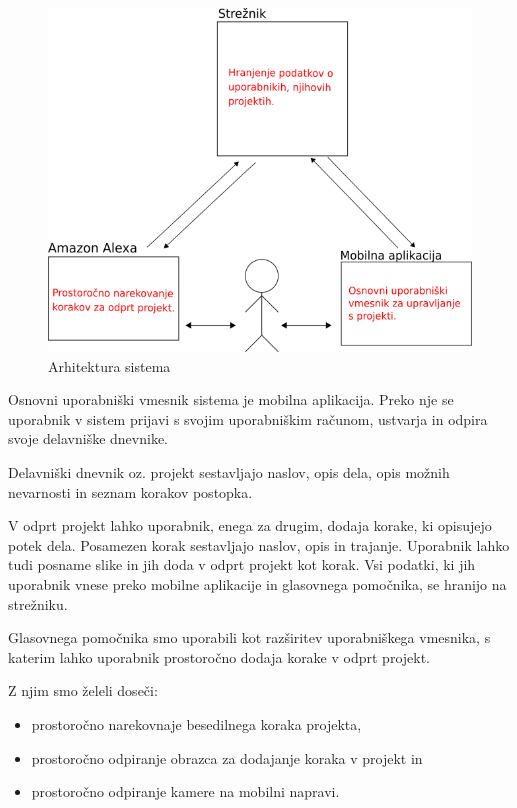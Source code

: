\documentclass[a4paper, 12pt]{book}
\begin{document}
\clearpage

\begin{figure}[H]
\begin{center}
\includegraphics[width=13cm]{plan_simple}
\end{center}
\caption{Arhitektura sistema}
\label{plan_simple}
\end{figure}


Osnovni uporabniški vmesnik sistema je mobilna aplikacija.
Preko nje se uporabnik v sistem prijavi s svojim uporabniškim računom, ustvarja in odpira svoje delavniške dnevnike.

Delavniški dnevnik oz. projekt sestavljajo naslov, opis dela, opis možnih nevarnosti in seznam korakov postopka.

V odprt projekt lahko uporabnik, enega za drugim, dodaja korake, ki opisujejo potek dela.
Posamezen korak sestavljajo naslov, opis in trajanje.
Uporabnik lahko tudi posname slike in jih doda v odprt projekt kot korak.
Vsi podatki, ki jih uporabnik vnese preko mobilne aplikacije in glasovnega pomočnika, se hranijo na strežniku.

Glasovnega pomočnika smo uporabili kot razširitev uporabniškega vmesnika, s katerim lahko uporabnik prostoročno dodaja korake v odprt projekt.

\noindent Z njim smo želeli doseči:
\begin{itemize}
	\item prostoročno narekovnaje besedilnega koraka projekta,
	\item prostoročno odpiranje obrazca za dodajanje koraka v projekt in
	\item prostoročno odpiranje kamere na mobilni napravi.
\end{itemize}
\end{document}

